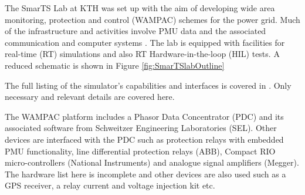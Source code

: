 \documentclass[journal]{IEEEtran}
\begin{document}
The SmarTS Lab at KTH was set up with the aim of developing wide area monitoring, protection and control (WAMPAC) schemes for the power grid. Much of the infrastructure and activities involve PMU data and the associated communication and computer systems  \cite{SmarTSLab}. The lab is equipped with facilities for real-time (RT) simulations and also RT Hardware-in-the-loop (HIL) tests. A reduced schematic is shown in Figure \ref{fig:SmarTSlabOutline}


%

The full listing of the simulator's capabilities and interfaces is covered in \cite{PhasorPODImplement}. Only necessary and relevant details are covered here.

The WAMPAC platform includes a Phasor Data Concentrator (PDC) and its associated software from Schweitzer Engineering Laboratories (SEL). Other devices are interfaced with the PDC such as protection relays with embedded PMU functionality, line differential protection relays (ABB), Compact RIO micro-controllers (National Instruments) and analogue signal amplifiers (Megger)\cite{SmarTSLab}. The hardware list here is incomplete and other devices are also used such as a GPS receiver, a relay current and voltage injection kit etc.

\end{document}
